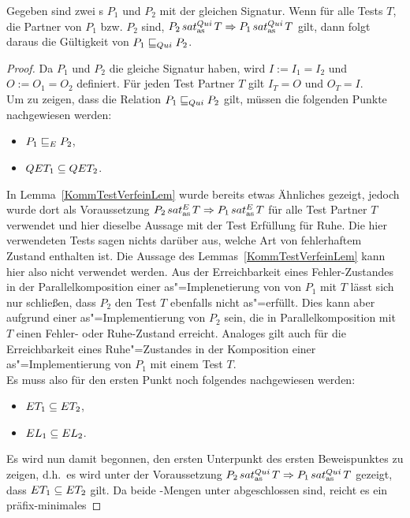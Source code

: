 \begin{Lem}
  \label{RuheTestVerfeinLem}
  Gegeben sind zwei \MEIO{}s $P_1$ und $P_2$ mit der gleichen Signatur. Wenn
  für alle Tests $T$, die Partner von $P_1$ bzw. $P_2$ sind, $P_2\hspace{0.05cm}sat_\mathrm{as}^{Qui}\hspace{0.05cm} T
  \Rightarrow P_1\hspace{0.05cm}sat_\mathrm{as}^{Qui}\hspace{0.05cm} T$ gilt, dann folgt daraus die Gültigkeit von
  $P_1 \sqsubseteq  _{Qui} P_2$.
\end{Lem}
\begin{proof}
  Da $P_1$ und $P_2$ die gleiche Signatur haben, wird $I:=I_1=I_2$ und
  $O:=O_1=O_2$ definiert. Für jeden Test Partner $T$ gilt $I_T=O$ und
  $O_T=I$.\\
  Um zu zeigen, dass die Relation $P_1 \sqsubseteq  _{Qui} P_2$ gilt, müssen die folgenden
  Punkte nachgewiesen werden:
  \begin{itemize}
    \item $P_1 \sqsubseteq  _E P_2$,
    \item $QET _1\subseteq QET _2$.
  \end{itemize}
  In Lemma~\ref{KommTestVerfeinLem} wurde bereits etwas Ähnliches gezeigt,
  jedoch wurde dort als Voraussetzung $P_2\hspace{0.05cm}sat_\mathrm{as}^E\hspace{0.05cm} T\Rightarrow P_1\hspace{0.05cm}sat_\mathrm{as}^E\hspace{0.05cm} T$
  für alle Test Partner $T$ verwendet und hier dieselbe Aussage mit der Test
  Erfüllung für Ruhe. Die hier verwendeten Tests sagen nichts darüber aus,
  welche Art von \glqq fehlerhaftem Zustand\grqq{} enthalten ist. Die Aussage
  des Lemmas~\ref{KommTestVerfeinLem} kann hier also nicht verwendet werden.
  Aus der Erreichbarkeit eines Fehler-Zustandes in der Parallelkomposition
  einer as"=Implenetierung von von $P_1$ mit $T$ lässt sich nur schließen, dass
  $P_2$ den Test $T$ ebenfalls nicht as"=erfüllt. Dies kann aber aufgrund einer
  as"=Implementierung von $P_2$ sein, die in Parallelkomposition mit $T$ einen
  Fehler- oder Ruhe-Zustand erreicht. Analoges gilt auch für die Erreichbarkeit
  eines Ruhe"=Zustandes in der Komposition einer as"=Implementierung von $P_1$
  mit einem Test $T$.\\
  Es muss also für den ersten Punkt noch folgendes nachgewiesen werden:
  \begin{itemize}
    \item $ET _1\subseteq ET _2$,
    \item $EL _1\subseteq EL _2$.
  \end{itemize}
  Es wird nun damit begonnen, den ersten Unterpunkt des ersten Beweispunktes zu
  zeigen, d.h.\ es wird unter der Voraussetzung $P_2\hspace{0.05cm}sat_\mathrm{as}^{Qui}\hspace{0.05cm} T\Rightarrow
  P_1\hspace{0.05cm}sat_\mathrm{as}^{Qui}\hspace{0.05cm} T$ gezeigt, dass $ET _1\subseteq ET _2$ gilt. Da beide
  \ET{}-Mengen unter \cont{} abgeschlossen sind, reicht es ein präfix-minimales

\end{proof}
